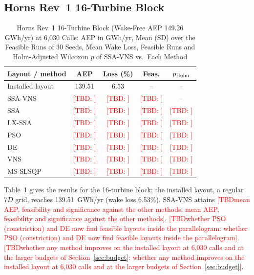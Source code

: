 \documentclass[journal,twoside]{IEEEtran}
\newcommand{\TBD}[1]{\textcolor{red}{[TBD\ifx\relax#1\relax\else: #1\fi]}}
\begin{document}
\subsection{Horns Rev~1 16-Turbine Block}
\label{sec:hornsrev-site}
\begin{table}[!t]
\centering
\caption{Horns Rev~1 16-Turbine Block (Wake-Free AEP 149.26 GWh/yr) at 6,030 Calls: AEP in GWh/yr, Mean (SD) over the Feasible Runs of 30 Seeds, Mean Wake Loss, Feasible Runs and Holm-Adjusted Wilcoxon $p$ of SSA-VNS vs.\ Each Method}
\label{tab:hr-site}
\scriptsize\setlength{\tabcolsep}{3pt}
\begin{tabular}{lcccc}
\toprule
Layout / method & AEP & Loss (\%) & Feas. & $p_{\rm Holm}$ \\
\midrule
Installed layout & 139.51 & 6.53 & -- & -- \\
\midrule
SSA-VNS & \TBD{} & \TBD{} & \TBD{} & -- \\
SSA & \TBD{} & \TBD{} & \TBD{} & \TBD{} \\
LX-SSA & \TBD{} & \TBD{} & \TBD{} & \TBD{} \\
PSO & \TBD{} & \TBD{} & \TBD{} & \TBD{} \\
DE & \TBD{} & \TBD{} & \TBD{} & \TBD{} \\
VNS & \TBD{} & \TBD{} & \TBD{} & \TBD{} \\
MS-SLSQP & \TBD{} & \TBD{} & \TBD{} & \TBD{} \\
\bottomrule
\end{tabular}
\end{table}

Table~\ref{tab:hr-site} gives the results for the 16-turbine block; the installed layout, a regular $7D$ grid, reaches 139.51~GWh/yr (wake loss 6.53\%). SSA-VNS attains \TBD{mean AEP, feasibility and significance against the other methods}. \TBD{whether PSO (constriction) and DE now find feasible layouts inside the parallelogram}. \TBD{whether any method improves on the installed layout at 6,030 calls and at the larger budgets of Section~\ref{sec:budget}}.
\end{document}
